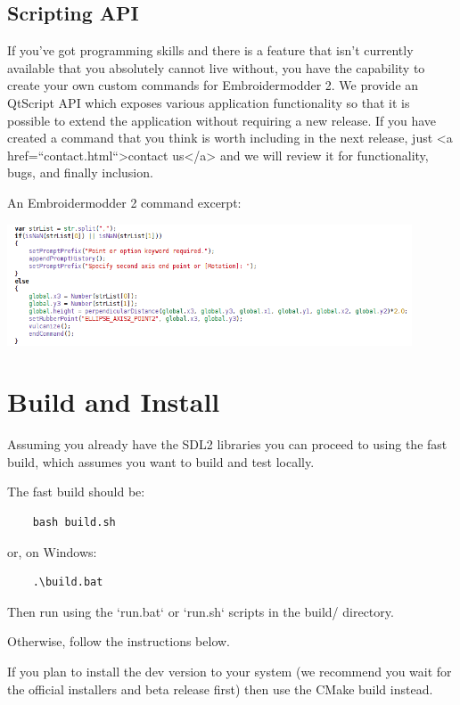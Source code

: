 \subsection{Scripting API}

If you've got programming skills and there is a feature that isn't currently available that you absolutely cannot live without, you have the capability to create your own custom commands for Embroidermodder 2. We provide an QtScript API which exposes various application functionality so that it is possible to extend the application without requiring a new release. If you have created a command that you think is worth including in the next release, just <a href=``contact.html``>contact us</a> and we will review it for functionality, bugs, and finally inclusion.

An Embroidermodder 2 command excerpt:

\includegraphics[width=0.9\textwidth]{images/features-scripting-1.png}

\section{Build and Install}

Assuming you already have the SDL2 libraries you can proceed to using the fast build, which assumes you want to build and test locally.

The fast build should be:

\begin{lstlisting}
    bash build.sh
\end{lstlisting}

or, on Windows:

\begin{lstlisting}
    .\build.bat
\end{lstlisting}

Then run using the `run.bat` or `run.sh` scripts in the build/ directory.

Otherwise, follow the instructions below.

If you plan to install the dev version to your system (we recommend you wait for the official installers and beta release first) then use the CMake build instead.

